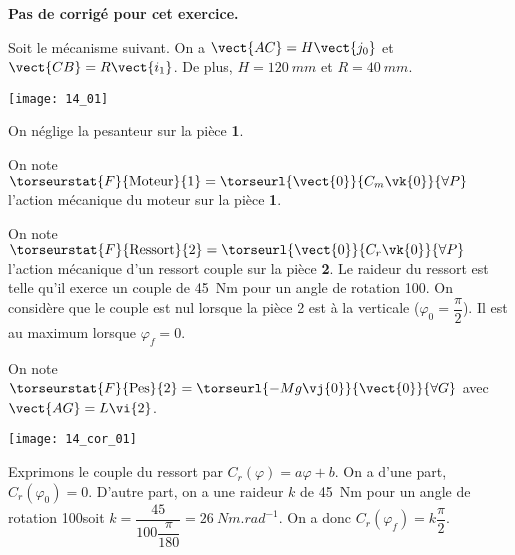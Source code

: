 \normalfalse \difficiletrue \tdifficilefalse
\correctiontrue


\setcounter{numques}{0}
\ifcorrection
\else
\textbf{Pas de corrigé pour cet exercice.}
\fi

\ifprof
\else
Soit le mécanisme suivant. On a $\vect{AC}=H\vect{j_0}$ et $\vect{CB}=R\vect{i_1}$. De plus, 
$H=\SI{120}{mm}$ et $R=\SI{40}{mm}$. 

\begin{center}
\texttt{[image: 14\_01]}
\end{center}
\fi

On néglige la pesanteur sur la pièce \textbf{1}. 

On note $\torseurstat{F}{\text{Moteur}}{1} = \torseurl{\vect{0}}{C_m\vk{0}}{\forall P}$ l'action mécanique du moteur sur la pièce \textbf{1}.

On note $\torseurstat{F}{\text{Ressort}}{2} = \torseurl{\vect{0}}{C_r\vk{0}}{\forall P}$ l'action mécanique d'un ressort couple sur la pièce \textbf{2}. Le raideur du ressort est telle qu'il exerce un couple de \SI{45}{Nm} pour un angle de rotation 100\degres. On considère que le couple est nul lorsque la pièce 2 est à la verticale ($\varphi_0=\dfrac{\pi}{2}$). Il est au maximum lorsque $\varphi_f=0$.

On note $\torseurstat{F}{\text{Pes}}{2} = \torseurl{-Mg\vj{0}}{\vect{0}}{\forall G}$ avec $\vect{AG}=L\vi{2}$. 

\ifprof
\begin{center}
\texttt{[image: 14\_cor\_01]}
\end{center}
\else
\fi

\ifprof
Exprimons le couple du ressort par $C_r(\varphi)=a\varphi + b$. On a d'une part, $C_r(\varphi_0)=0$. D'autre part, on a une raideur $k$ de \SI{45}{Nm} pour un angle de rotation 100\degres soit $k=\dfrac{45}{100 \dfrac{\pi}{180}} = \SI{26}{Nm.rad^{-1}}$. On a donc  $C_r(\varphi_f)=k \dfrac{\pi}{2}$.

